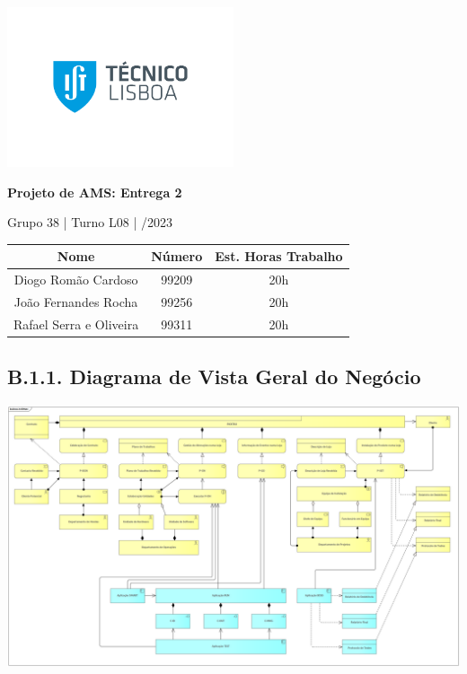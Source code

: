 \documentclass[12pt,a4paper]{article}
\begin{document}
\begin{titlepage}
	\begin{center}

		\vspace*{0.5cm}
		\includegraphics[width=0.5\textwidth]{ist-logo.png}

		\vspace{1cm}
		\Huge
		\textbf{Projeto de AMS: Entrega 2}

		\vspace{0.5cm}
		\LARGE
		Grupo 38 \quad | \quad Turno L08 \quad | /2023

		\vfill
	\end{center}

	\large
	\begin{tabular}{c|c|c}
		\textbf{Nome}           & \textbf{Número} & \textbf{Est. Horas Trabalho} \\
		\hline
		Diogo Romão Cardoso     & 99209           & 20h                          \\
		João Fernandes Rocha    & 99256           & 20h                          \\
		Rafael Serra e Oliveira & 99311           & 20h
	\end{tabular}

	\vspace{5cm}
\end{titlepage}

\begin{landscape}
	\section*{B.1.1. Diagrama de Vista Geral do Negócio}
	\includegraphics[width=1.59\textwidth]{../ArchiMate.png}
\end{landscape}
\end{document}
